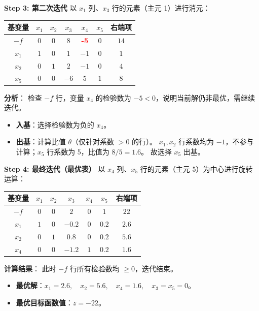 \documentclass[a4paper,12pt]{ctexart} %
\begin{document}
	\textbf{Step 3: 第二次迭代}
	以 $x_1$ 列、$x_3$ 行的元素（主元 1）进行消元：
	
	\begin{table}[H]
		\centering
		\renewcommand{\arraystretch}{1.3}
		\begin{tabular}{c|ccccc|c}
			\toprule
			\textbf{基变量} & $x_1$ & $x_2$ & $x_3$ & $x_4$ & $x_5$ & \textbf{右端项} \\
			\hline
			$-f$ & $0$ & $0$ & $8$ & \textcolor{red}{\textbf{-5}} & $0$ & $14$ \\
			\hline
			$x_1$ & $1$ & $0$ & $1$ & $-1$ & $0$ & $1$ \\
			$x_2$ & $0$ & $1$ & $2$ & $-1$ & $0$ & $4$ \\
			$x_5$ & $0$ & $0$ & $-6$ & $5$ & $1$ & $8$ \\
			\bottomrule
		\end{tabular}
	\end{table}
	
	\textbf{分析}：
	检查 $-f$ 行，变量 $x_4$ 的检验数为 $-5 < 0$，说明当前解仍非最优，需继续迭代。
	\begin{itemize}
		\item \textbf{入基}：选择检验数为负的 \textbf{$x_4$}。
		\item \textbf{出基}：计算比值 $\theta$（仅针对系数 $>0$ 的行）。
		$x_1, x_2$ 行系数均为 $-1$，不参与计算；$x_5$ 行系数为 5，比值为 $8/5 = 1.6$。
		故选择 \textbf{$x_5$} 出基。
	\end{itemize}
	
	\textbf{Step 4: 最终迭代（最优表）}
	以 $x_4$ 列、$x_5$ 行的元素（主元 5）为中心进行旋转运算：
	
	\begin{table}[H]
		\centering
		\renewcommand{\arraystretch}{1.3}
		\begin{tabular}{c|ccccc|c}
			\toprule
			\textbf{基变量} & $x_1$ & $x_2$ & $x_3$ & $x_4$ & $x_5$ & \textbf{右端项} \\
			\hline
			$-f$ & $0$ & $0$ & $2$ & $0$ & $1$ & $22$ \\
			\hline
			$x_1$ & $1$ & $0$ & $-0.2$ & $0$ & $0.2$ & $2.6$ \\
			$x_2$ & $0$ & $1$ & $0.8$ & $0$ & $0.2$ & $5.6$ \\
			$x_4$ & $0$ & $0$ & $-1.2$ & $1$ & $0.2$ & $1.6$ \\
			\bottomrule
		\end{tabular}
	\end{table}
	
	\textbf{计算结果}：
	此时 $-f$ 行所有检验数均 $\ge 0$，迭代结束。
	\begin{itemize}
		\item \textbf{最优解}：$x_1=2.6, \quad x_2=5.6, \quad x_4=1.6, \quad x_3=x_5=0$。
		\item \textbf{最优目标函数值}：$z = -22$。
	\end{itemize}
	
\end{document}
